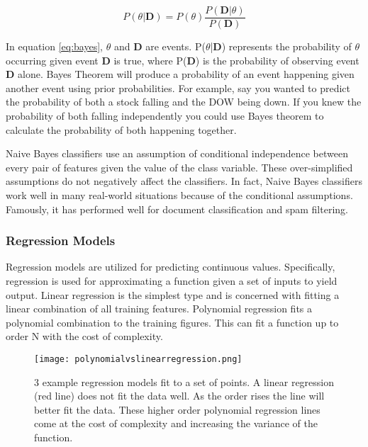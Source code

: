 \begin{equation}
    \label{eq:bayes}
    P(\theta|\textbf{D}) = P(\theta) \frac{P(\textbf{D} |\theta)}{P(\textbf{D})}
\end{equation}

In equation \ref{eq:bayes}, $\theta$ and \textbf{D} are events. 
P($\theta$|\textbf{D}) represents the probability of $\theta$ occurring given event \textbf{D} is true, where P(\textbf{D}) is the probability of observing event \textbf{D} alone.
Bayes Theorem will produce a probability of an event happening given another event using prior probabilities.
For example, say you wanted to predict the probability of both a stock falling and the DOW being down.
If you knew the probability of both falling independently you could use Bayes theorem to calculate the probability of both happening together.

Naive Bayes classifiers use an assumption of conditional independence between every pair of features given the value of the class variable. 
These over-simplified assumptions do not negatively affect the classifiers.
In fact, Naive Bayes classifiers work well in many real-world situations because of the conditional assumptions\cite{zhang2004optimality}.
Famously, it has performed well for document classification and spam filtering. 

\subsubsection{Regression Models}
Regression models are utilized for predicting continuous values.
Specifically, regression is used for approximating a function given a set of inputs to yield output.
Linear regression is the simplest type and is concerned with fitting a linear combination of all training features.
Polynomial regression fits a polynomial combination to the training figures.
This can fit a function up to order N with the cost of complexity.

\begin{figure}[htp]
    \centering
    \texttt{[image: polynomialvslinearregression.png]}
    \caption{3 example regression models fit to a set of points.
    A linear regression (red line) does not fit the data well.
    As the order rises the line will better fit the data.
    These higher order polynomial regression lines come at the cost of complexity and increasing the variance of the function.}
    \label{fig:repressionexample}
\end{figure}

